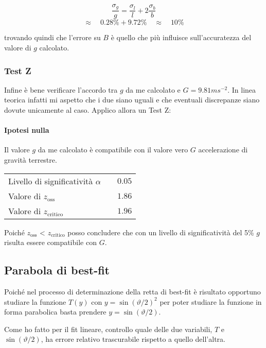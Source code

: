 \documentclass{article}
\begin{document}
\[
		\frac{\sigma_g}{g} = \frac{\sigma_l}{l} + 2\frac{\sigma_b}{b} 
\]
\[
		\approx \quad 0.28 \% + 9.72 \% \quad \approx  \quad 10\%	
\]

trovando quindi che l'errore su $B$ è quello che più influisce sull'accuratezza del valore di $g$ calcolato.
\\

\subsubsection{Test Z}
Infine è bene verificare l'accordo tra $g$ da me calcolato e $G = 9.81 ms^{-2}$. In linea teorica infatti mi aspetto che i due siano uguali e che eventuali discrepanze siano dovute unicamente al caso. Applico allora un Test Z:

\paragraph{Ipotesi nulla} Il valore $g$ da me calcolato è compatibile con il valore vero $G$ accelerazione di gravità terrestre.


\begin{table}[H]
	\centering
	\begin{tabular}{lr}
		Livello di significatività $\alpha$	& $\quad 0.05$  \\
		Valore di $z_\text{oss}$             	& $\quad 1.86$  \\
		Valore di $z_{\text{critico}}$ 		& $\quad 1.96$  \\ 
	\end{tabular}
\end{table}

\noindent
Poiché $z_\text{oss}$ < $z_{\text{critico}}$ posso concludere che con un livello di significatività del 5\% $g$ risulta essere compatibile con $G$.


\newpage
\subsection{Parabola di best-fit}
Poiché nel processo di determinazione della retta di best-fit è risultato opportuno studiare la funzione $T(y)$ con $y = \sin{\left( \vartheta / 2\right)}^2$ per poter studiare la funzione in forma parabolica basta prendere $y =  \sin{\left( \vartheta / 2\right)}$.

Come ho fatto per il fit lineare, controllo quale delle due variabili, $T$ e $ \sin{\left( \vartheta / 2\right)}$, ha errore relativo trascurabile rispetto a quello dell'altra.
\end{document}
